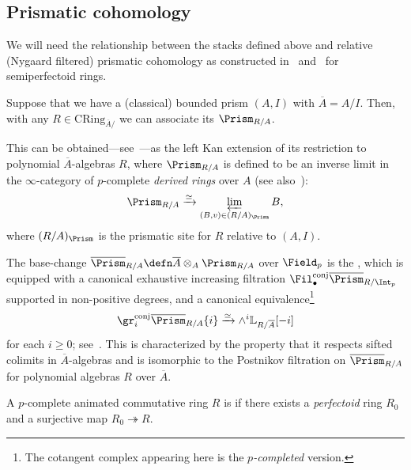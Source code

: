 \documentclass[10pt]{amsart}
\begin{document}
\subsection{Prismatic cohomology}
\label{subsec:cohomology}

We will need the relationship between the stacks defined above and relative (Nygaard filtered) prismatic cohomology as constructed in~\cite{Bhatt2022-ee} and~\cite{bhatt2022absolute} for semiperfectoid rings.

\begin{definition}
Suppose that we have a (classical) bounded prism $(A,I)$ with $\overline{A} = A/I$. Then, with any $R\in \mathrm{CRing}_{\overline{A}/}$ we can associate its  $\Prism_{R/A}$. 

This can be obtained---see~\cite[Construction 4.1.3]{bhatt2022absolute}---as the left Kan extension of its restriction to polynomial $\overline{A}$-algebras $R$, where $\Prism_{R/A}$ is defined to be an inverse limit in the $\infty$-category of $p$-complete \emph{derived rings} over $A$ (see also~\cite[\S 7]{bhatt2022prismatization}):
\[
\Prism_{R/A}\xrightarrow{\simeq}\varprojlim_{(B,v)\in (R/A)_{\Prism}}B,
\]
where $(R/A)_{\Prism}$ is the prismatic site for $R$ relative to $(A,I)$.
\end{definition}



\begin{remark}
\label{rem:hodge-tate_cohomology}
The base-change $\overline{\Prism}_{R/A} \defn \overline{A}\otimes_A\Prism_{R/A}$ over $\Field_p$ is the , which is equipped with a canonical exhaustive increasing filtration $\Fil_\bullet^{\mathrm{conj}}\overline{\Prism}_{R/\Int_p}$ supported in non-positive degrees, and a canonical equivalence\footnote{The cotangent complex appearing here is the $p$\emph{-completed} version.}
\[
\gr_{i}^{\mathrm{conj}}\overline{\Prism}_{R/A}\{i\}\xrightarrow{\simeq}\wedge^i\mathbb{L}_{R/\overline{A}}[-i]
\]
for each $i\ge 0$; see~\cite[Remark 4.1.7]{bhatt2022absolute}. This is characterized by the property that it respects sifted colimits in $\overline{A}$-algebras and is isomorphic to the Postnikov filtration on $\overline{\Prism}_{R/A}$ for polynomial algebras $R$ over $\overline{A}$.
\end{remark}


\begin{definition}
\label{defn:semiperfectoid}
A $p$-complete animated commutative ring $R$ is  if there exists a \emph{perfectoid} ring $R_0$ and a surjective map $R_0\twoheadrightarrow R$. 

\end{definition}  
\end{document}
